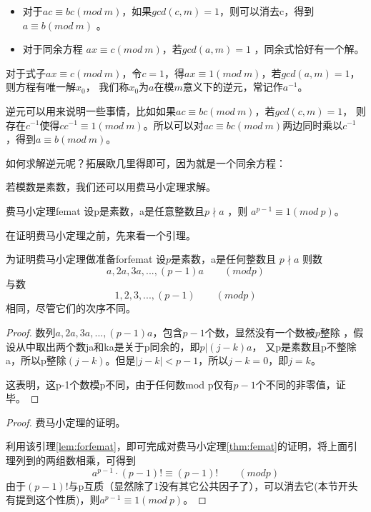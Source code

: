 \begin{itemize}
	\item 对于$ac\equiv bc(mod \ m)$，如果$gcd(c,m)=1$，则可以消去c，得到$a\equiv b(mod \ m)$ 。
	\item 对于同余方程 $ax\equiv c(mod\ m)$，若$gcd(a,m)=1$ ，同余式恰好有一个解。
\end{itemize}

{\heiti 对于式子$ax\equiv c(mod\ m)$，令$c=1$，得$ax\equiv 1(mod\ m)$，若$gcd(a,m)=1$，则方程有唯一解$x_0$，
我们称$x_0$为$a$在模$m$意义下的逆元，常记作$a^{-1}$。}

逆元可以用来说明一些事情，比如如果$ac\equiv bc(mod\ m)$，若$gcd(c,m)=1$，
则存在$c^{-1}$使得$cc^{-1}\equiv 1 (mod\ m)$。所以可以对$ac\equiv bc(mod\ m)$两边同时乘以$c^{-1}$，得到$a\equiv b(mod\ m)$。

如何求解逆元呢？拓展欧几里得即可，因为就是一个同余方程：


\vbox{}

若模数是素数，我们还可以用费马小定理求解。

\begin{theorem}{费马小定理}{femat}
	设p是素数，a是任意整数且$p\nmid a$ ，则 $a^{p-1}\equiv 1(mod\ p)$。 
\end{theorem}

在证明费马小定理之前，先来看一个引理。

\begin{lemma}{为证明费马小定理做准备}{forfemat}
	设$p$是素数，a是任何整数且 $p\nmid a$ 则数
	$$
	a,2a,3a,...,(p-1)a\qquad (modp)
	$$
	与数
	$$
	1,2,3,...,(p-1)\qquad (modp)
	$$
	相同，尽管它们的次序不同。
\end{lemma}

\begin{proof}
	数列$a,2a,3a,...,(p-1)a$，包含$p-1$个数，显然没有一个数被$p$整除 ，假设从中取出两个数ja和ka是关于p同余的，即$p|(j-k)a$，
	又p是素数且p不整除a，所以p整除$(j-k)$。但是$|j-k|<p-1 $，所以$j-k=0$，即$j=k$。
	
	这表明，这p-1个数模p不同，由于任何数mod p仅有$p-1$个不同的非零值，证毕。
\end{proof}

\begin{proof}
	费马小定理的证明。
	
	利用该引理\ref{lem:forfemat}，即可完成对费马小定理\ref{thm:femat}的证明，将上面引理列到的两组数相乘，可得到
	$$
	a^{p-1} \cdot (p-1)!\equiv (p-1)!   \qquad (modp)
	$$
	由于$(p-1)!$与p互质（显然除了1没有其它公共因子了），可以消去它(本节开头有提到这个性质)，则$a^{p-1}\equiv 1(mod\ p)$。
\end{proof}

